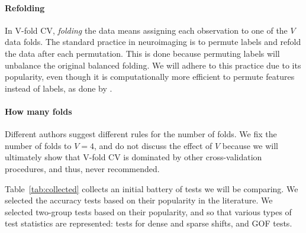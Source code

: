 \documentclass[]{bio}
\begin{document}
\paragraph{Refolding}
In V-fold CV, \emph{folding} the data means assigning each observation to one of the $V$ data folds. 
The standard practice in neuroimaging is to permute labels and refold the data after each permutation. 
This is done because permuting labels will unbalance the original balanced folding.
We will adhere to this practice due to its popularity, even though it is computationally more efficient to permute features instead of labels, as done by \cite{golland_permutation_2005}.


\paragraph{How many folds}
Different authors suggest different rules for the number of folds. 
We fix the number of folds to $V=4$, and do not discuss the effect of $V$ because we will ultimately show that V-fold CV is dominated by other cross-validation procedures, and thus, never recommended. 

\bigskip

Table~\ref{tab:collected} collects an initial battery of tests we will be comparing. 
We selected the accuracy tests based on their popularity in the literature.
We selected two-group tests based on their popularity, and so that various types of test statistics are represented: tests for dense and sparse shifts, and GOF tests. 
\end{document}
